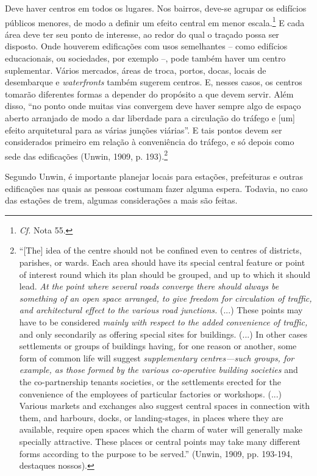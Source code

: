 \documentclass[12pt, a4paper]{book} %
\begin{document}
        Deve haver centros em todos os lugares. Nos bairros, deve-se agrupar os edifícios públicos menores, de modo a definir um efeito central em menor escala.\footnote[57]{\textit{Cf.} Nota 55.} E cada área deve ter seu ponto de interesse, ao redor do qual o traçado possa ser disposto. Onde houverem edificações com usos semelhantes – como edifícios educacionais, ou sociedades, por exemplo –, pode também haver um centro suplementar. Vários mercados, áreas de troca, portos, docas, locais de desembarque e \textit{waterfronts} também sugerem centros. E, nesses casos, os centros tomarão diferentes formas a depender do propósito a que devem servir. Além disso, ``no ponto onde muitas vias convergem deve haver sempre algo de espaço aberto arranjado de modo a dar liberdade para a circulação do tráfego e [um] efeito arquitetural para as várias junções viárias''. E tais pontos devem ser considerados primeiro em relação à conveniência do tráfego, e só depois como sede das edificações (Unwin, 1909, p. 193).\footnote[58]{``[The] idea of the centre should not be confined even to centres of districts, parishes, or wards. Each area should have its special central feature or point of interest round which its plan should be grouped, and up to which it should lead. \textit{At the point where several roads converge there should always be something of an open space arranged, to give freedom for circulation of traffic, and architectural effect to the various road junctions.} (...) These points may have to be considered \textit{mainly with respect to the added convenience of traffic,} and only secondarily as offering special sites for buildings. (...) In other cases settlements or groups of buildings having, for one reason or another, some form of common life will suggest \textit{supplementary centres—such groups, for example, as those formed by the various co-operative building societies} and the co-partnership tenants societies, or the settlements erected for the convenience of the employees of particular factories or workshops. (...) Various markets and exchanges also suggest central spaces in connection with them, and harbours, docks, or landing-stages, in places where they are available, require open spaces which the charm of water will generally make specially attractive. These places or central points may take many different forms according to the purpose to be served.''  (Unwin, 1909, pp. 193-194, destaques nossos).}

        Segundo Unwin, é importante planejar locais para estações, prefeituras e outras edificações nas quais as pessoas costumam fazer alguma espera. Todavia, no caso das estações de trem, algumas considerações a mais são feitas. 
\end{document}
